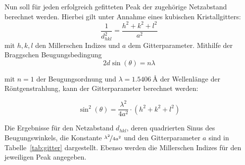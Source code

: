 Nun soll für jeden erfolgreich gefitteten Peak der zugehörige Netzabstand berechnet werden. Hierbei gilt unter Annahme eines kubischen Kristallgitters:
\begin{equation}\label{eq:netzabstand}
    \frac{1}{d^2_{hkl}} = \frac{h^2 + k^2 + l^2}{a^2}
\end{equation}
mit $h, k, l$ den Millerschen Indizes und $a$ dem Gitterparameter. Mithilfe der Braggschen Beugungsbedingung
\begin{equation}
    2d\sin(\theta) = n\lambda
\end{equation}

mit $n = 1$ der Beugungsordnung und $\lambda = \SI{1,5406}{\angstrom}$ der Wellenlänge der Röntgenstrahlung, kann der Gitterparameter berechnet werden:

\begin{equation}
    \sin^2(\theta) = \frac{\lambda^2}{4a^2} \cdot (h^2 + k^2 + l^2)
\end{equation}

Die Ergebnisse für den Netzabstand $d_{hkl}$, deren quadrierten Sinus des Beugungswinkels, die Konstante $\nicefrac[]{\lambda^2}{4a^2}$ und den Gitterparameter $a$ sind in Tabelle~\ref{tab:gitter} dargestellt. Ebenso werden die Millerschen Indizes für den jeweiligen Peak angegeben.

